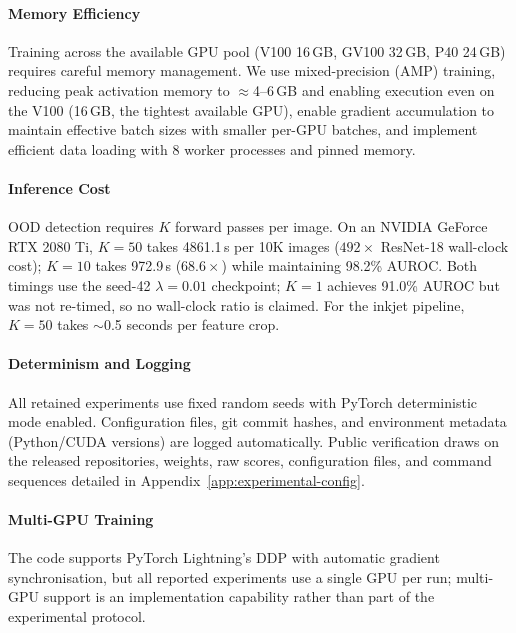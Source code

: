 \paragraph{Memory Efficiency}

Training across the available GPU pool (V100 16\,GB, GV100 32\,GB, P40 24\,GB) requires careful memory management. We use mixed-precision (AMP) training, reducing peak activation memory to $\approx$4--6\,GB and enabling execution even on the V100 (16\,GB, the tightest available GPU), enable gradient accumulation to maintain effective batch sizes with smaller per-GPU batches, and implement efficient data loading with 8 worker processes and pinned memory.

\paragraph{Inference Cost}

OOD detection requires $K$ forward passes per image. On an NVIDIA GeForce RTX 2080 Ti, $K = 50$ takes 4861.1\,s per 10K images ($492\times$ ResNet-18 wall-clock cost); $K = 10$ takes 972.9\,s ($68.6\times$) while maintaining 98.2\% AUROC. Both timings use the seed-42 $\lambda{=}0.01$ checkpoint; $K = 1$ achieves 91.0\% AUROC but was not re-timed, so no wall-clock ratio is claimed. For the inkjet pipeline, $K = 50$ takes $\sim$0.5 seconds per feature crop.

\paragraph{Determinism and Logging}

All retained experiments use fixed random seeds with PyTorch deterministic mode enabled. Configuration files, git commit hashes, and environment metadata (Python/CUDA versions) are logged automatically. Public verification draws on the released repositories, weights, raw scores, configuration files, and command sequences detailed in Appendix~\ref{app:experimental-config}.

\paragraph{Multi-GPU Training}

The code supports PyTorch Lightning's DDP with automatic gradient synchronisation, but all reported experiments use a single GPU per run; multi-GPU support is an implementation capability rather than part of the experimental protocol.

